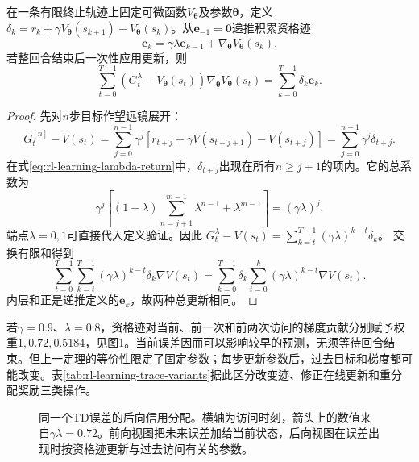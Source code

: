 \begin{theorem}[固定参数下前后向更新等价]
  \label{thm:rl-learning-trace-equivalence}
  在一条有限终止轨迹上固定可微函数$V_{\bm{\theta}}$及参数$\bm{\theta}$，定义$\delta_k=r_k+\gamma V_{\bm{\theta}}(s_{k+1})-V_{\bm{\theta}}(s_k)$。从$\bm{e}_{-1}=\bm{0}$递推积累资格迹
  \[
    \bm{e}_k=\gamma\lambda\bm{e}_{k-1}
                    +\nabla_{\bm{\theta}}V_{\bm{\theta}}(s_k).
  \]
  若整回合结束后一次性应用更新，则
  \begin{equation}
    \sum_{t=0}^{T-1}
      (G_t^\lambda-V_{\bm{\theta}}(s_t))
      \nabla_{\bm{\theta}}V_{\bm{\theta}}(s_t)
      =\sum_{k=0}^{T-1}\delta_k\bm{e}_k .
    \label{eq:rl-learning-trace-equivalence}
  \end{equation}
\end{theorem}
\begin{proof}
  先对$n$步目标作望远镜展开：
  \[
    G_t^{[n]}-V(s_t)
       =\sum_{j=0}^{n-1}\gamma^j
          [r_{t+j}+\gamma V(s_{t+j+1})-V(s_{t+j})]
       =\sum_{j=0}^{n-1}\gamma^j\delta_{t+j}.
  \]
  在式\eqref{eq:rl-learning-lambda-return}中，$\delta_{t+j}$出现在所有$n\geq j+1$的项内。它的总系数为
  \[
    \gamma^j\left[(1-\lambda)
       \sum_{n=j+1}^{m-1}\lambda^{n-1}
       +\lambda^{m-1}\right]=(\gamma\lambda)^j.
  \]
  端点$\lambda=0,1$可直接代入定义验证。因此
  $G_t^\lambda-V(s_t)=\sum_{k=t}^{T-1}(\gamma\lambda)^{k-t}\delta_k$。
  交换有限和得到
  \[
    \sum_{t=0}^{T-1}\sum_{k=t}^{T-1}
       (\gamma\lambda)^{k-t}\delta_k\nabla V(s_t)
    =
    \sum_{k=0}^{T-1}\delta_k
       \sum_{t=0}^k(\gamma\lambda)^{k-t}\nabla V(s_t).
  \]
  内层和正是递推定义的$\bm{e}_k$，故两种总更新相同。
\end{proof}

若$\gamma=0.9$、$\lambda=0.8$，资格迹对当前、前一次和前两次访问的梯度贡献分别赋予权重$1,0.72,0.5184$，见图\ref{fig:rl-learning-traces}。当前误差因而可以影响较早的预测，无须等待回合结束。但上一定理的等价性限定了固定参数；每步更新参数后，过去目标和梯度都可能改变。表\ref{tab:rl-learning-trace-variants}据此区分改变迹、修正在线更新和重分配奖励三类操作。

\begin{figure}[htbp]
  \centering
  
  \caption{同一个TD误差的后向信用分配。横轴为访问时刻，箭头上的数值来自$\gamma\lambda=0.72$。前向视图把未来误差加给当前状态，后向视图在误差出现时按资格迹更新与过去访问有关的参数。}
  \label{fig:rl-learning-traces}
\end{figure}

